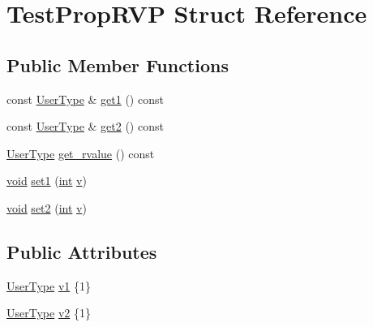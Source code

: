 \hypertarget{struct_test_prop_r_v_p}{}\section{Test\+Prop\+R\+VP Struct Reference}
\label{struct_test_prop_r_v_p}
\subsection*{Public Member Functions}
\begin{DoxyCompactItemize}
\item 
const \mbox{\hyperlink{class_user_type}{User\+Type}} \& \mbox{\hyperlink{struct_test_prop_r_v_p_ada1003e85c3d81e8824b2b8365c8a9de}{get1}} () const
\item 
const \mbox{\hyperlink{class_user_type}{User\+Type}} \& \mbox{\hyperlink{struct_test_prop_r_v_p_acd49a7018a64359d86181da3b4e2d86c}{get2}} () const
\item 
\mbox{\hyperlink{class_user_type}{User\+Type}} \mbox{\hyperlink{struct_test_prop_r_v_p_a1c9ac5e3c204f3f4efed05b2d64d4744}{get\+\_\+rvalue}} () const
\item 
\mbox{\hyperlink{_s_d_l__opengles2__gl2ext_8h_ae5d8fa23ad07c48bb609509eae494c95}{void}} \mbox{\hyperlink{struct_test_prop_r_v_p_a6543c13c527d505b9fd2501f0a5ab448}{set1}} (\mbox{\hyperlink{warnings_8h_a74f207b5aa4ba51c3a2ad59b219a423b}{int}} \mbox{\hyperlink{_s_d_l__opengl_8h_a10a82eabcb59d2fcd74acee063775f90}{v}})
\item 
\mbox{\hyperlink{_s_d_l__opengles2__gl2ext_8h_ae5d8fa23ad07c48bb609509eae494c95}{void}} \mbox{\hyperlink{struct_test_prop_r_v_p_a35fccfb9120260be4c290f6fd5884770}{set2}} (\mbox{\hyperlink{warnings_8h_a74f207b5aa4ba51c3a2ad59b219a423b}{int}} \mbox{\hyperlink{_s_d_l__opengl_8h_a10a82eabcb59d2fcd74acee063775f90}{v}})
\end{DoxyCompactItemize}
\subsection*{Public Attributes}
\begin{DoxyCompactItemize}
\item 
\mbox{\hyperlink{class_user_type}{User\+Type}} \mbox{\hyperlink{struct_test_prop_r_v_p_ad35c589f3c9a873ef2653778ee5c872e}{v1}} \{1\}
\item 
\mbox{\hyperlink{class_user_type}{User\+Type}} \mbox{\hyperlink{struct_test_prop_r_v_p_aa8d27467eb5aae4113118ca085078e55}{v2}} \{1\}
\end{DoxyCompactItemize}
